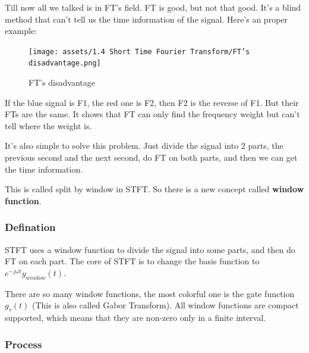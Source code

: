 \documentclass[12pt]{ctexart}
\begin{document}
Till now all we talked is in FT's field. FT is good, but not that good. It's a blind
method that can't tell us the time information of the signal. Here's an proper example:

\begin{figure}[H]
  \centering
  \texttt{[image: assets/1.4 Short Time Fourier Transform/FT's
  disadvantage.png]}
  \caption{FT's disadvantage}
\end{figure}

If the blue signal is F1, the red one is F2, then F2 is the reverse of F1. But their
FTs are the same. It shows that FT can only find the frequency weight but can't tell
where the weight is.

It's also simple to solve this problem. Just divide the signal into 2 parts, the previous
second and the next second, do FT on both parts, and then we can get the time information.

This is called split by window in STFT. So there is a new concept called
\textbf{window function}.

\subsubsection{\textbf{Defination}}

STFT uses a window function to divide the signal into some parts, and then do FT on
each part. The core of STFT is to change the basis function to $e^{-j\omega t}y_{window}(t)$.

There are so many window functions, the most colorful one is the gate function $g_\tau(t)$
(This is also called Gabor Transform). All window functions are compact supported, which
means that they are non-zero only in a finite interval.

\subsubsection{\textbf{Process}}
\end{document}
